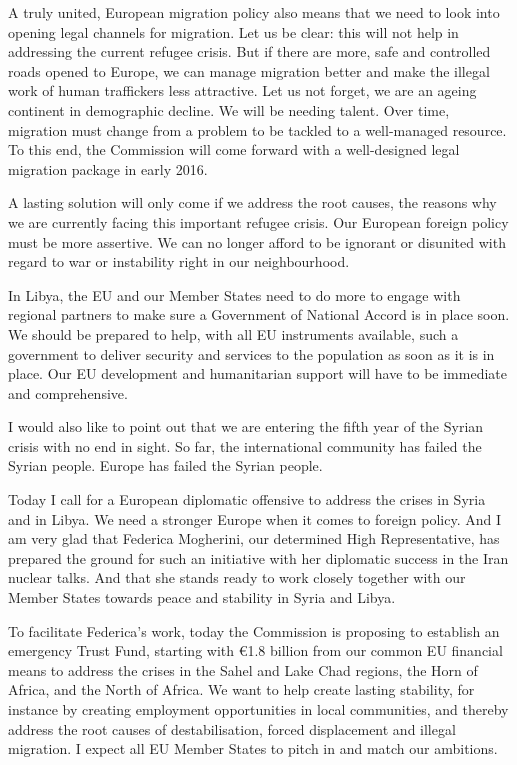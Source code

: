 \documentclass[a4paper,11pt]{article}
\begin{document}
A truly united, European migration policy also means that we need to look into opening legal channels for migration. Let us be clear: this will not help in addressing the current refugee crisis. But if there are more, safe and controlled roads opened to Europe, we can manage migration better and make the illegal work of human traffickers less attractive. Let us not forget, we are an ageing continent in demographic decline. We will be needing talent. Over time, migration must change from a problem to be tackled to a well-managed resource. To this end, the Commission will come forward with a well-designed legal migration package in early 2016.

A lasting solution will only come if we address the root causes, the reasons why we are currently facing this important refugee crisis. Our European foreign policy must be more assertive. We can no longer afford to be ignorant or disunited with regard to war or instability right in our neighbourhood.

In Libya, the EU and our Member States need to do more to engage with regional partners to make sure a Government of National Accord is in place soon. We should be prepared to help, with all EU instruments available, such a government to deliver security and services to the population as soon as it is in place. Our EU development and humanitarian support will have to be immediate and comprehensive.

I would also like to point out that we are entering the fifth year of the Syrian crisis with no end in sight. So far, the international community has failed the Syrian people. Europe has failed the Syrian people.

Today I call for a European diplomatic offensive to address the crises in Syria and in Libya. We need a stronger Europe when it comes to foreign policy. And I am very glad that Federica Mogherini, our determined High Representative, has prepared the ground for such an initiative with her diplomatic success in the Iran nuclear talks. And that she stands ready to work closely together with our Member States towards peace and stability in Syria and Libya.

To facilitate Federica’s work, today the Commission is proposing to establish an emergency Trust Fund, starting with \euro1.8 billion from our common EU financial means to address the crises in the Sahel and Lake Chad regions, the Horn of Africa, and the North of Africa. We want to help create lasting stability, for instance by creating employment opportunities in local communities, and thereby address the root causes of destabilisation, forced displacement and illegal migration. I expect all EU Member States to pitch in and match our ambitions.
\end{document}
